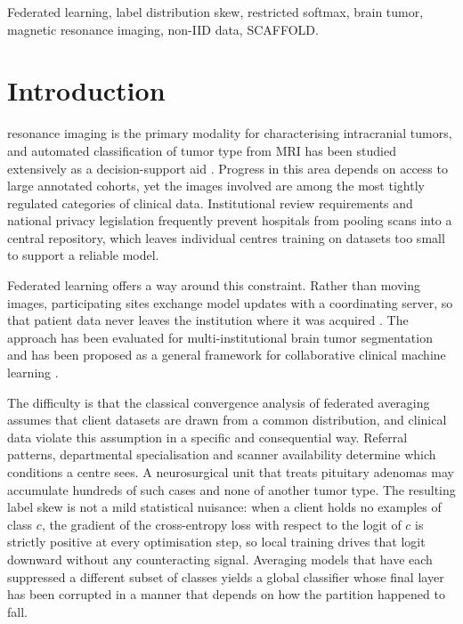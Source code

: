 \documentclass[journal]{IEEEtran}
\begin{document}
\begin{IEEEkeywords}
Federated learning, label distribution skew, restricted softmax, brain tumor,
magnetic resonance imaging, non-IID data, SCAFFOLD.
\end{IEEEkeywords}

\section{Introduction}
 resonance imaging is the primary modality for
characterising intracranial tumors, and automated classification of tumor type
from MRI has been studied extensively as a decision-support aid
\cite{cheng2015,gumaei2019,deepak2019}. Progress in this area depends on access
to large annotated cohorts, yet the images involved are among the most tightly
regulated categories of clinical data. Institutional review requirements and
national privacy legislation frequently prevent hospitals from pooling scans
into a central repository, which leaves individual centres training on datasets
too small to support a reliable model.

Federated learning offers a way around this constraint. Rather than moving
images, participating sites exchange model updates with a coordinating server,
so that patient data never leaves the institution where it was acquired
\cite{mcmahan2017,kairouz2021}. The approach has been evaluated for
multi-institutional brain tumor segmentation \cite{sheller2020} and has been
proposed as a general framework for collaborative clinical machine learning
\cite{rieke2020}.

The difficulty is that the classical convergence analysis of federated
averaging assumes that client datasets are drawn from a common distribution,
and clinical data violate this assumption in a specific and consequential way.
Referral patterns, departmental specialisation and scanner availability
determine which conditions a centre sees. A neurosurgical unit that treats
pituitary adenomas may accumulate hundreds of such cases and none of another
tumor type. The resulting label skew is not a mild statistical nuisance: when a
client holds no examples of class $c$, the gradient of the cross-entropy loss
with respect to the logit of $c$ is strictly positive at every optimisation
step, so local training drives that logit downward without any counteracting
signal. Averaging models that have each suppressed a different subset of
classes yields a global classifier whose final layer has been corrupted in a
manner that depends on how the partition happened to fall.
\end{document}
